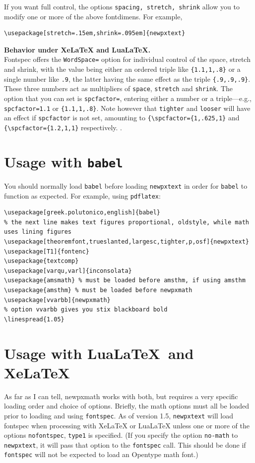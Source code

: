 \documentclass[11pt]{article}
\theoremstyle{oldplain}
\theoremstyle{plain}
\begin{document}
If you want full control, the options {\tt spacing, stretch, shrink} allow you to modify one or more of the above fontdimens. For example,
\begin{verbatim}
\usepackage[stretch=.15em,shrink=.095em]{newpxtext}
\end{verbatim}
\textbf{Behavior under XeLaTeX and LuaLaTeX.}\\
Fontspec  offers the {\tt WordSpace=} option for individual control of the space, stretch and shrink, with the value being either an ordered triple like \verb|{1.1,1,.8}| or a single number like {\tt .9}, the latter having the same effect as the triple \verb|{.9,.9,.9}|. These three numbers act as multipliers of {\tt space}, {\tt stretch} and {\tt shrink}. The option that you can set is {\tt spcfactor=}, entering either a number or a triple---e.g., {\tt spcfactor=1.1} or \verb|{1.1,1,.8}|. Note however that {\tt tighter} and {\tt looser} will have an effect if {\tt spcfactor} is not set, amounting to \verb|{\spcfactor={1,.625,1}| and \verb|{\spcfactor={1.2,1,1}| respectively.
.

\section{Usage with {\tt babel}}
You should normally load {\tt babel} before loading {\tt newpxtext} in order for {\tt babel} to function as expected.  For example, using {\tt pdflatex}:
\begin{verbatim}
\usepackage[greek.polutonico,english]{babel}
% the next line makes text figures proportional, oldstyle, while math uses lining figures
\usepackage[theoremfont,trueslanted,largesc,tighter,p,osf]{newpxtext}
\usepackage[T1]{fontenc}
\usepackage{textcomp}
\usepackage[varqu,varl]{inconsolata}
\usepackage{amsmath} % must be loaded before amsthm, if using amsthm
\usepackage{amsthm} % must be loaded before newpxmath
\usepackage[vvarbb]{newpxmath}
% option vvarbb gives you stix blackboard bold
\linespread{1.05}
\end{verbatim}

\section{Usage with Lua\LaTeX\ and Xe\LaTeX}
As far as I can tell, \textsf{newpxmath} works with both, but requires a very specific loading order and choice of options. Briefly,  the math options must all be loaded prior to loading and using {\tt fontspec}. As of version 1.5, {\tt newpxtext} will load fontspec when processing with XeLaTeX or LuaLaTeX unless one or more of the options {\tt nofontspec}, {\tt type1} is specified. (If you specify the option {\tt no-math} to {\tt newpxtext}, it will pass that option to the {\tt fontspec} call. This should be done if  {\tt fontspec} will not be expected to load an Opentype math font.)
\end{document}
